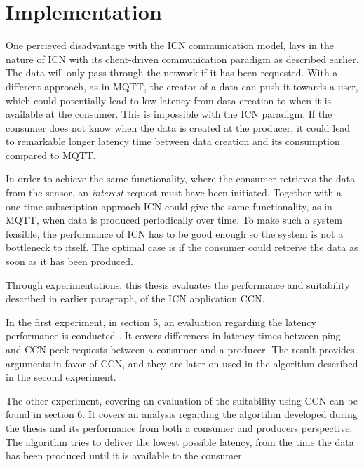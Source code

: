 \section{Implementation}
One percieved disadvantage with the ICN communication model, lays in the nature of ICN with its client-driven communication paradigm as described earlier. The data will only pass through the network if it has been requested. With a different approach, as in MQTT, the creator of a data can push it towards a user, which could potentially lead to low latency from data creation to when it is available at the consumer. This is impossible with the ICN paradigm. If the consumer does not know when the data is created at the producer, it could lead to remarkable longer latency time between data creation and its consumption compared to MQTT.%

In order to achieve the same functionality, where the consumer retrieves the data from the sensor, an \textit{interest} request must have been initiated. Together with a one time subscription approach ICN could give the same functionality, as in MQTT, when data is produced periodically over time. To make such a system feasible, the performance of ICN has to be good enough so the system is not a bottleneck to itself. The optimal case is if the consumer could retreive the data as soon as it has been produced.

Through experimentations, this thesis evaluates the performance and suitability described in earlier paragraph, of the ICN application CCN.

In the first experiment, in section 5, an evaluation regarding the latency performance is conducted . It covers differences in latency times between ping- and CCN peek requests between a consumer and a producer. The result provides arguments in favor of CCN, and they are later on used in the algorithm described in the second experiment.

The other experiment, covering an evaluation of the suitability using CCN can be found in section 6. It covers an analysis regarding the algortihm developed during the thesis and its performance from both a consumer and producers perspective. The algorithm tries to deliver the lowest possible latency, from the time the data has been produced until it is available to the consumer. 


